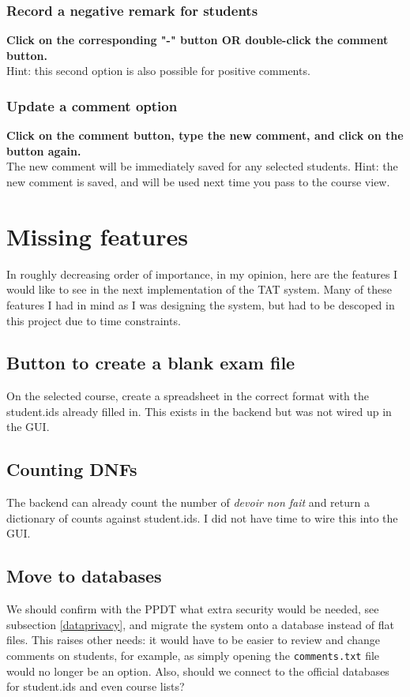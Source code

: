 \documentclass[10pt]{article}
\begin{document}
\subsubsection{Record a negative remark for students}
\textbf{Click on the corresponding "-" button OR double-click the comment button.} \\
Hint: this second option is also possible for positive comments.

\subsubsection{Update a comment option}
\textbf{Click on the comment button, type the new comment, and click on the button again.} \\
The new comment will be immediately saved for any selected students. 
Hint: the new comment is saved, and will be used next time you pass to the course view.





\section{Missing features} \label{notdone}

In roughly decreasing order of importance, in my opinion, here are the features I would like to see in the next implementation of the TAT system. Many of these features I had in mind as I was designing the system, but had to be descoped in this project due to time constraints.

\subsection{Button to create a blank exam file}
On the selected course, create a spreadsheet in the correct format with the student.ids already filled in. This exists in the backend but was not wired up in the GUI.

\subsection{Counting DNFs}
The backend can already count the number of \emph{devoir non fait} and return a dictionary of counts against student.ids. I did not have time to wire this into the GUI.

\subsection{Move to databases}
We should confirm with the PPDT what extra security would be needed, see subsection \ref{dataprivacy}, and migrate the system onto a database instead of flat files. This raises other needs: it would have to be easier to review and change comments on students, for example, as simply opening the \texttt{comments.txt} file would no longer be an option. Also, should we connect to the official databases for student.ids and even course lists?
\end{document}

